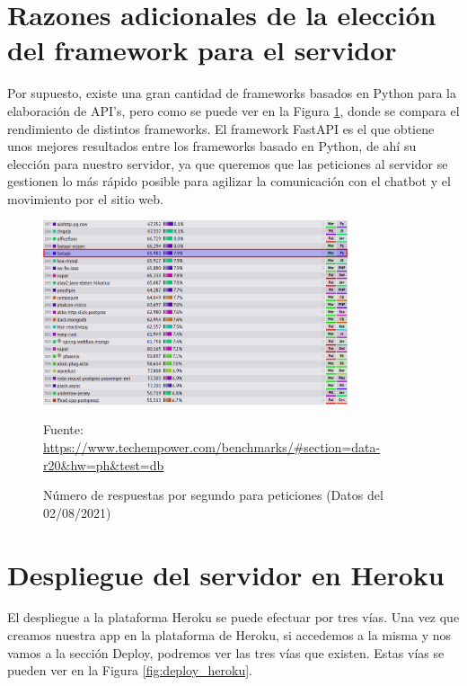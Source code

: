\section{Razones adicionales de la elección del framework para el servidor} \label{sec:razones_framework_server}

Por supuesto, existe una gran cantidad de frameworks basados en Python para la elaboración de API's, pero como se puede ver en la Figura \ref{fig:comparativa_fastapi}, donde se compara el rendimiento de distintos frameworks. El framework FastAPI es el que obtiene unos mejores resultados entre los frameworks basado en Python, de ahí su elección para nuestro servidor, ya que queremos que las peticiones al servidor se gestionen lo más rápido posible para agilizar la comunicación con el chatbot y el movimiento por el sitio web.

\begin{figure}[h]
\centering
\includegraphics[width=0.8\textwidth]{imagenes/07_Implementacion/comparativa_fastapi.png}
\begin{center}
Fuente: \url{https://www.techempower.com/benchmarks/#section=data-r20&hw=ph&test=db}
\end{center}
\caption{Número de respuestas por segundo para peticiones (Datos del 02/08/2021)}
\label{fig:comparativa_fastapi}
\end{figure}


\section{Despliegue del servidor en Heroku} \label{sec:proce_despli_server_Heroku}

El despliegue a la plataforma Heroku se puede efectuar por tres vías. Una vez que creamos nuestra app en la plataforma de Heroku, si accedemos a la misma y nos vamos a la sección Deploy, podremos ver las tres vías que existen. Estas vías se pueden ver en la Figura \ref{fig:deploy_heroku}.

